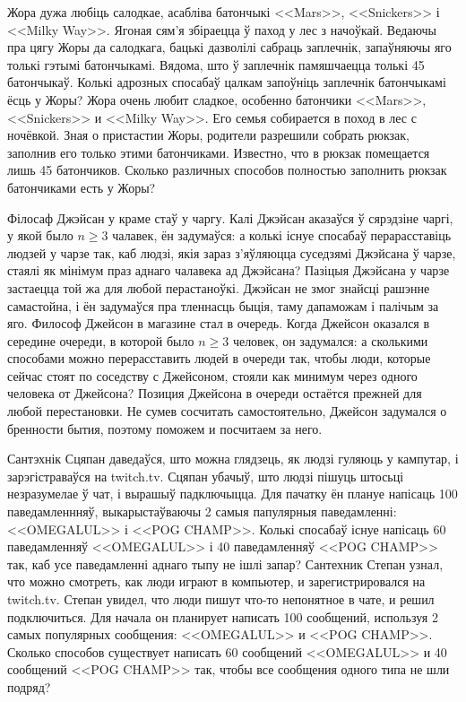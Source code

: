 \begin{problemList}
\bigskip

\problemItemSimple
{Жора дужа любіць салодкае, асабліва батончыкі <<Mars>>, <<Snickers>> і <<Milky Way>>.
Ягоная сям'я збіраецца ў паход у лес з начоўкай.
Ведаючы пра цягу Жоры да салодкага, бацькі дазволілі сабраць заплечнік, запаўняючы яго толькі гэтымі батончыкамі.
Вядома, што ў заплечнік памяшчаецца толькі 45 батончыкаў.
Колькі адрозных спосабаў цалкам запоўніць заплечнік батончыкамі ёсць у Жоры?}
{Жора очень любит сладкое, особенно батончики <<Mars>>, <<Snickers>> и <<Milky Way>>.
Его семья собирается в поход в лес с ночёвкой.
Зная о пристастии Жоры, родители разрешили собрать рюкзак, заполнив его только этими батончиками.
Известно, что в рюкзак помещается лишь 45 батончиков.
Сколько различных способов полностью заполнить рюкзак батончиками есть у Жоры?}

\bigskip

\problemItemSimple
{Філосаф Джэйсан у краме стаў у чаргу.
Калі Джэйсан аказаўся ў сярэдзіне чаргі, у якой было $n \ge 3$ чалавек, ён задумаўся: а колькі існуе спосабаў перарасставіць людзей у чарзе так,
каб людзі, якія зараз з'яўляюцца суседзямі Джэйсана ў чарзе, стаялі як мінімум праз аднаго чалавека ад Джэйсана?
Пазіцыя Джэйсана у чарзе застаецца той жа для любой перастаноўкі.
Джэйсан не змог знайсці рашэнне самастойна, і ён задумаўся пра тленнасць быція, таму дапаможам і палічым за яго.}
{Философ Джейсон в магазине стал в очередь.
Когда Джейсон оказался в середине очереди, в которой было $n \ge 3$ человек, он задумался: а сколькими способами можно перерасставить людей в очереди так,
чтобы люди, которые сейчас стоят по соседству с Джейсоном, стояли как минимум через одного человека от Джейсона?
Позиция Джейсона в очереди остаётся прежней для любой перестановки.
Не сумев сосчитать самостоятельно, Джейсон задумался о бренности бытия, поэтому поможем и посчитаем за него.}

\bigskip

\problemItemSimple
{Сантэхнік Сцяпан даведаўся, што можна глядзець, як людзі гуляюць у кампутар, і зарэгістраваўся на twitch.tv. Сцяпан убачыў, што людзі пішуць штосьці незразумелае ў чат, і вырашыў падключыцца.
Для пачатку ён плануе напісаць 100 паведамленнняў, выкарыстаўваючы 2 самыя папулярныя паведамленні: <<OMEGALUL>> і <<POG CHAMP>>.
Колькі спосабаў існуе напісаць 60 паведамленняў <<OMEGALUL>> і 40 паведамленняў <<POG CHAMP>> так, каб усе паведамленні аднаго тыпу не ішлі запар?}
{Сантехник Степан узнал, что можно смотреть, как люди играют в компьютер, и зарегистрировался на twitch.tv.
Степан увидел, что люди пишут что-то непонятное в чате, и решил подключиться.
Для начала он планирует написать 100 сообщений, используя 2 самых популярных сообщения: <<OMEGALUL>> и <<POG CHAMP>>.
Сколько способов существует написать 60 сообщений <<OMEGALUL>> и 40 сообщений <<POG CHAMP>> так, чтобы все сообщения одного типа не шли подряд?}

\end{problemList}

